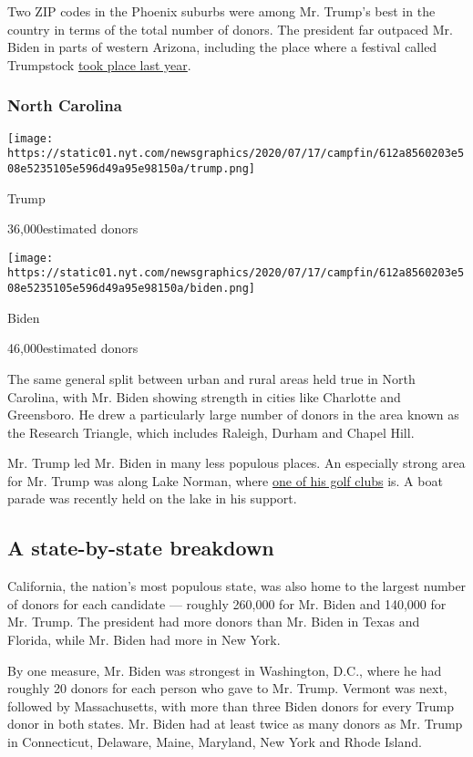 Two ZIP codes in the Phoenix suburbs were among Mr. Trump's best in the
country in terms of the total number of donors. The president far
outpaced Mr. Biden in parts of western Arizona, including the place
where a festival called Trumpstock
\href{https://www.nytimes.com/2019/12/28/us/politics/trump-2020-trumpstock.html}{took
place last year}.

\hypertarget{north-carolina}{%
\subsubsection{North Carolina}\label{north-carolina}}

\texttt{[image: https://static01.nyt.com/newsgraphics/2020/07/17/campfin/612a8560203e508e5235105e596d49a95e98150a/trump.png]}

Trump

36,000estimated donors

\texttt{[image: https://static01.nyt.com/newsgraphics/2020/07/17/campfin/612a8560203e508e5235105e596d49a95e98150a/biden.png]}

Biden

46,000estimated donors

The same general split between urban and rural areas held true in North
Carolina, with Mr. Biden showing strength in cities like Charlotte and
Greensboro. He drew a particularly large number of donors in the area
known as the Research Triangle, which includes Raleigh, Durham and
Chapel Hill.

Mr. Trump led Mr. Biden in many less populous places. An especially
strong area for Mr. Trump was along Lake Norman, where
\href{https://www.nytimes.com/2017/09/09/business/president-trump-organization-business-golf.html}{one
of his golf clubs} is. A boat parade was recently held on the lake in
his support.

\hypertarget{a-state-by-state-breakdown}{%
\subsection{A state-by-state
breakdown}\label{a-state-by-state-breakdown}}

California, the nation's most populous state, was also home to the
largest number of donors for each candidate --- roughly 260,000 for Mr.
Biden and 140,000 for Mr. Trump. The president had more donors than Mr.
Biden in Texas and Florida, while Mr. Biden had more in New York.

By one measure, Mr. Biden was strongest in Washington, D.C., where he
had roughly 20 donors for each person who gave to Mr. Trump. Vermont was
next, followed by Massachusetts, with more than three Biden donors for
every Trump donor in both states. Mr. Biden had at least twice as many
donors as Mr. Trump in Connecticut, Delaware, Maine, Maryland, New York
and Rhode Island.

